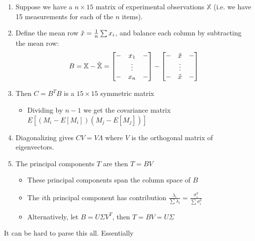 \documentclass[12pt]{article} %
\begin{document}
\begin{enumerate}[itemsep = -1pt,topsep=0pt]
    \item
Suppose we have a $n \times 15$ matrix of experimental observations $\mathbb{X}$ (i.e. we have 15 measurements for each of the $n$ items).

    \item
Define the mean row $\Tilde{x} = \frac{1}{n} \sum x_i$, and balance each column by subtracting the mean row:
\begin{equation*}
    B = \mathbb{X} - \Tilde{\mathbb{X}}
    =
    \begin{bmatrix}
    - & x_1 & - \\
    & \vdots & \\
    - & x_n & -
    \end{bmatrix}
    -
    \begin{bmatrix}
    - & \Tilde{x} & - \\
    & \vdots & \\
    - & \Tilde{x} & -
    \end{bmatrix}
\end{equation*}

    \item
Then $C = B^TB$ is a $15 \times 15$ symmetric matrix 
    \begin{itemize}[topsep=-1pt,itemsep=-1pt]
        \item Dividing by $n-1$ we get the covariance matrix $E[(M_i - E[M_i])(M_j - E[M_j])]$
    \end{itemize}
    
    \item 
    Diagonalizing gives $CV = V\Lambda$ where $V$ is the orthogonal matrix of eigenvectors.
    
    \item The principal components $T$ are then $T = BV$
    \begin{itemize}[topsep=-1pt,itemsep=-1pt]
        \item These principal components span the column space of $B$
        \item The $i$th principal component has contribution $\frac{\lambda_i}{\sum \lambda_i} = \frac{\sigma_i^2}{\sum \sigma_i^2}$
        \item Alternatively, let $B = U \Sigma V^T$, then $T = BV = U \Sigma$
    \end{itemize}
\end{enumerate}
It can be hard to parse this all. Essentially 
\end{document}
